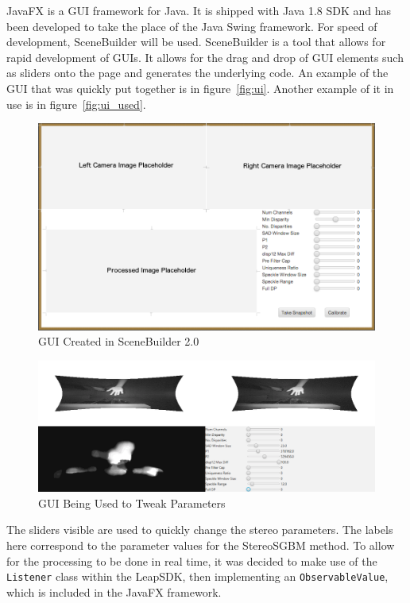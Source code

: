 \documentclass[11pt,oneside]{report}
\newcommand\code[1]{\texttt{#1}}
\begin{document}
		JavaFX is a GUI framework for Java.
		It is shipped with Java 1.8 SDK and has been developed to take the place of the Java Swing framework.
		For speed of development, SceneBuilder will be used.
		SceneBuilder is a tool that allows for rapid development of GUIs.
		It allows for the drag and drop of GUI elements such as sliders onto the page and generates the underlying code.
		An example of the GUI that was quickly put together is in figure~\ref{fig:ui}.
		Another example of it in use is in figure~\ref{fig:ui_used}.
		\begin{figure}
			\centering
    				\includegraphics[width=\textheight, angle=90]{ui_design2}
    				\caption{GUI Created in SceneBuilder 2.0 \protect {\label{fig:ui}}}
		\end{figure}	
		\begin{figure}
			\centering
    				\includegraphics[width=\textheight,angle=90]{first_test}
    				\caption{GUI Being Used to Tweak Parameters \protect {\label{fig:ui_used}}}
		\end{figure}	
		The sliders visible are used to quickly change the stereo parameters.
		The labels here correspond to the parameter values for the StereoSGBM method.
		To allow for the processing to be done in real time, it was decided to make use of the \code{Listener} class within the LeapSDK, then implementing an \code{ObservableValue}, which is included in the JavaFX framework.
\end{document}
